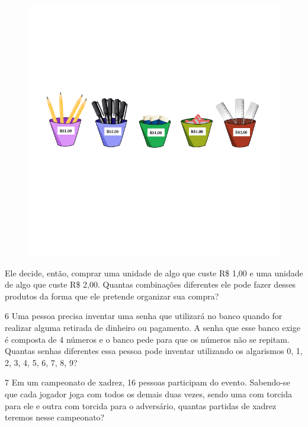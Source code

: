 \begin{figure}[htpb!]
\includegraphics[width=\textwidth]{../ilustracoes/MAT5/SAEB_5ANO_MAT_figura83.png}
\end{figure}

Ele decide, então, comprar uma unidade de algo que custe R\$ 1,00 e uma unidade de
algo que custe R\$ 2,00. Quantas combinações diferentes ele pode fazer
desses produtos da forma que ele pretende organizar sua compra?



\num{6} Uma pessoa precisa inventar uma senha que utilizará no banco quando
for realizar alguma retirada de dinheiro ou pagamento. A senha que esse
banco exige é composta de 4 números e o banco pede para que os números
não se repitam. Quantas senhas diferentes essa pessoa pode inventar
utilizando os algarismos 0, 1, 2, 3, 4, 5, 6, 7, 8, 9?



\num{7} Em um campeonato de xadrez, 16 pessoas participam do evento.
Sabendo-se que cada jogador joga com todos os demais duas vezes, sendo
uma com torcida para ele e outra com torcida para o adversário, quantas
partidas de xadrez teremos nesse campeonato?

